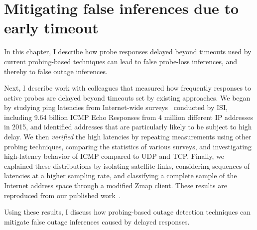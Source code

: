 
\chapter{Mitigating false inferences due to early timeout}
\label{cpt:timeouts}

In this chapter, I describe how probe responses delayed beyond
timeouts used by current probing-based techniques can lead to false
probe-loss inferences, and thereby to false outage inferences. 

Next, I describe work with colleagues that measured how frequently responses
to active probes are delayed beyond timeouts set by existing
approaches. We began by studying ping latencies from Internet-wide surveys~\cite{census-survey} conducted by ISI,
including 9.64 billion ICMP Echo Responses from 4 million different IP
addresses in 2015, and identified addresses that are particularly likely
to be subject to high delay.  We then \emph{verified} the high latencies
by repeating measurements using other probing techniques, comparing the
statistics of various surveys, and investigating high-latency
behavior of ICMP compared to UDP and TCP.  Finally, we
explained these distributions by isolating satellite links,
considering sequences of latencies at a higher sampling rate,
and classifying a complete sample of the Internet address
space through a modified Zmap client. These results are reproduced
from our published work~\cite{timeouts}.

Using these results, I discuss how probing-based outage
detection techniques can mitigate false outage inferences caused by
delayed responses.


